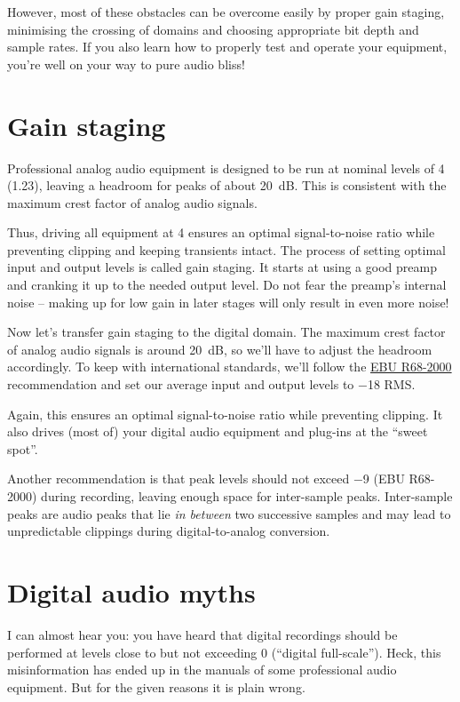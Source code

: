 However, most of these obstacles can be overcome easily by proper gain
staging, minimising the crossing of domains and choosing appropriate
bit depth and sample rates.  If you also learn how to properly test
and operate your equipment, you're well on your way to pure audio
bliss!

\section{Gain staging}
\label{sec:gain_staging}

Professional analog audio equipment is designed to be run at nominal
levels of \SI[addsign=all]{+4}{\dBu} (\SI{1.23}{\VRMS}), leaving a
headroom for peaks of about \SI{20}{\dB}.  This is consistent with the
maximum crest factor of analog audio signals.

Thus, driving all equipment at \SI[addsign=all]{+4}{\dBu} ensures an
optimal signal-to-noise ratio while preventing clipping and keeping
transients intact.  The process of setting optimal input and output
levels is called gain staging.  It starts at using a good preamp and
cranking it up to the needed output level.  Do not fear the preamp's
internal noise -- making up for low gain in later stages will only
result in even more noise!

Now let's transfer gain staging to the digital domain.  The maximum
crest factor of analog audio signals is around \SI{20}{\dB}, so we'll
have to adjust the headroom accordingly.  To keep with international
standards, we'll follow the
\href{http://tech.ebu.ch/publications/r068}{EBU R68-2000}
recommendation and set our average input and output levels to
\SI{-18}{\dBFS} RMS.

Again, this ensures an optimal signal-to-noise ratio while preventing
clipping.  It also drives (most of) your digital audio equipment and
plug-ins at the ``sweet spot''.

Another recommendation is that peak levels should not exceed
\SI{-9}{\dBFS} (EBU R68-2000) during recording, leaving enough space
for inter-sample peaks.  Inter-sample peaks are audio peaks that lie
\emph{in between} two successive samples and may lead to unpredictable
clippings during digital-to-analog conversion.

\section{Digital audio myths}
\label{sec:digital_audio_myths}

I can almost hear you: you have heard that digital recordings should
be performed at levels close to but not exceeding \SI{0}{\dBFS}
(``digital full-scale'').  Heck, this misinformation has ended up in
the manuals of some professional audio equipment.  But for the given
reasons it is plain wrong.

